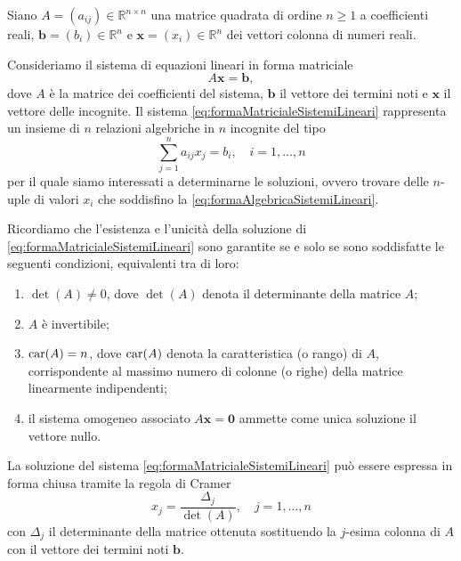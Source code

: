 \nocite{Quarteroni2000}
\nocite{Quarteroni1997}
Siano $A=(a_{ij})\in\mathbb{R}^{n\times n}$ una matrice quadrata di ordine $n\ge1$ a coefficienti reali, $\mathbf{b}=(b_{i})\in\mathbb{R}^{n}$
e $\mathbf{x}=(x_{i})\in\mathbb{R}^{n}$ dei vettori colonna di numeri reali.

Consideriamo il sistema di equazioni lineari in forma matriciale
\begin{equation}
    \label{eq:formaMatricialeSistemiLineari}
    A\mathbf{x}=\mathbf{b},
\end{equation}
dove $A$ \`e la matrice dei coefficienti del sistema, $\mathbf{b}$ il vettore dei termini noti e $\mathbf{x}$ il vettore delle incognite.\newline
Il sistema \eqref{eq:formaMatricialeSistemiLineari} rappresenta un insieme di $n$ relazioni algebriche in
$n$ incognite del tipo
\begin{equation}
    \label{eq:formaAlgebricaSistemiLineari}
    \sum_{j=1}^{n}a_{ij}x_{j}=b_{i},\quad i = 1,\dots,n
\end{equation}
per il quale siamo interessati a determinarne le soluzioni, ovvero trovare delle $n$-uple di valori $x_{i}$ che
soddisfino la \eqref{eq:formaAlgebricaSistemiLineari}.

Ricordiamo che l'esistenza e l'unicit\`a della soluzione di \eqref{eq:formaMatricialeSistemiLineari} sono garantite se e solo se sono soddisfatte
le seguenti condizioni, equivalenti tra di loro:
\begin{enumerate}
    \item $\det(A)\ne 0$, dove $\det(A)$ denota il determinante della matrice $A$;
    \item $A$ \`e invertibile;
    \item $\operatorname{car}(A)= n$, dove $\operatorname{car}(A)$ denota la caratteristica (o rango) di $A$, corrispondente al massimo numero di colonne (o righe) della matrice linearmente indipendenti;
    \item il sistema omogeneo associato $A\mathbf{x}=\mathbf{0}$ ammette come unica soluzione il vettore nullo.
\end{enumerate}

La soluzione del sistema \eqref{eq:formaMatricialeSistemiLineari} pu\`o essere espressa in forma chiusa tramite la regola di Cramer
\begin{equation}
    x_{j} = \frac{\Delta_{j}}{\det(A)},\quad j = 1,\dots,n
\end{equation}
con $\Delta_{j}$ il determinante della matrice ottenuta sostituendo la $j$-esima colonna di $A$ con il vettore dei termini noti $\mathbf{b}$.

